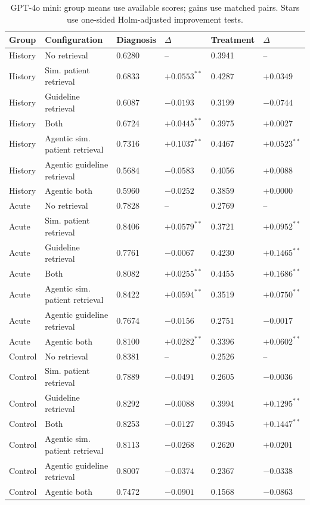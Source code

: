 \begin{table}[t]
\centering
\scriptsize
\begin{tabular}{llllll}
\toprule
Group & Configuration & Diagnosis & $\Delta$ & Treatment & $\Delta$ \\
\midrule
History & No retrieval & 0.6280 & -- & 0.3941 & -- \\
History & Sim. patient retrieval & 0.6833 & $+0.0553^{**}$ & 0.4287 & $+0.0349$ \\
History & Guideline retrieval & 0.6087 & $-0.0193$ & 0.3199 & $-0.0744$ \\
History & Both & 0.6724 & $+0.0445^{**}$ & 0.3975 & $+0.0027$ \\
History & Agentic sim. patient retrieval & 0.7316 & $+0.1037^{**}$ & 0.4467 & $+0.0523^{**}$ \\
History & Agentic guideline retrieval & 0.5684 & $-0.0583$ & 0.4056 & $+0.0088$ \\
History & Agentic both & 0.5960 & $-0.0252$ & 0.3859 & $+0.0000$ \\
\midrule
Acute & No retrieval & 0.7828 & -- & 0.2769 & -- \\
Acute & Sim. patient retrieval & 0.8406 & $+0.0579^{**}$ & 0.3721 & $+0.0952^{**}$ \\
Acute & Guideline retrieval & 0.7761 & $-0.0067$ & 0.4230 & $+0.1465^{**}$ \\
Acute & Both & 0.8082 & $+0.0255^{**}$ & 0.4455 & $+0.1686^{**}$ \\
Acute & Agentic sim. patient retrieval & 0.8422 & $+0.0594^{**}$ & 0.3519 & $+0.0750^{**}$ \\
Acute & Agentic guideline retrieval & 0.7674 & $-0.0156$ & 0.2751 & $-0.0017$ \\
Acute & Agentic both & 0.8100 & $+0.0282^{**}$ & 0.3396 & $+0.0602^{**}$ \\
\midrule
Control & No retrieval & 0.8381 & -- & 0.2526 & -- \\
Control & Sim. patient retrieval & 0.7889 & $-0.0491$ & 0.2605 & $-0.0036$ \\
Control & Guideline retrieval & 0.8292 & $-0.0088$ & 0.3994 & $+0.1295^{**}$ \\
Control & Both & 0.8253 & $-0.0127$ & 0.3945 & $+0.1447^{**}$ \\
Control & Agentic sim. patient retrieval & 0.8113 & $-0.0268$ & 0.2620 & $+0.0201$ \\
Control & Agentic guideline retrieval & 0.8007 & $-0.0374$ & 0.2367 & $-0.0338$ \\
Control & Agentic both & 0.7472 & $-0.0901$ & 0.1568 & $-0.0863$ \\
\midrule
\bottomrule
\end{tabular}
\caption{GPT-4o mini: group means use available scores; gains use matched pairs. Stars use one-sided Holm-adjusted improvement tests.}
\end{table}
